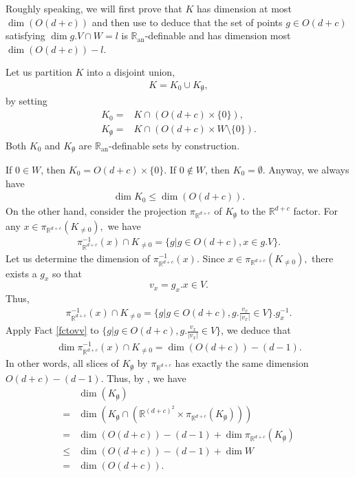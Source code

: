 \documentclass[11pt,a4paper]{amsart}
\numberwithin{equation}{section}
\newcommand{\es}{\emptyset}
\newcommand{\ran}{\mathbb{R}_{\operatorname{an}}}
\newcommand{\m}{^{-1}}
\newcommand{\R}{\mathbb{R}}
\theoremstyle{plain}
\theoremstyle{definition}
\numberwithin{equation}{subsection}
\begin{document}
Roughly speaking, we will first prove that $K$ has dimension at most $\dim(O(d+c))$ and then use \cite[Theorem 3.18]{MComin} to deduce that the set of points $g\in O(d+c)$ satisfying $\dim g.V\cap W=l$ is $\ran$-definable and has dimension most $\dim(O(d+c))-l$.

Let us partition $K$ into a disjoint union,
\begin{align*}
	K=K_0\cup K_{\not0},
\end{align*}
by setting
\begin{align*}
	K_0=&K\cap\left( O(d+c)\times\{0\}\right),\\ K_{\not0}=&K\cap \left(O(d+c)\times W\setminus\{0\}\right).
\end{align*}
Both $K_0$ and $K_{\not0}$ are $\ran$-definable sets by construction.

If $0\in W$, then $K_0= O(d+c)\times\{0\}$. If $0\not\in W$, then $K_0=\es.$ Anyway, we always have
\begin{align*}
	\dim K_0\le\dim(O(d+c)).
\end{align*}
On the other hand, consider the projection $\pi_{\R^{d+c}}$ of $K_{\not 0}$ to the $\R^{d+c}$ factor. For any $x\in \pi_{\R^{d+c}}(K_{\not=0}),$ we have
\begin{align*}
\pi_{\R^{d+c}}\m (x)\cap K_{\not=0}=\{g|g\in O(d+c),x\in g.V\}.
\end{align*}
Let us determine the dimension of $\pi_{\R^{d+c}}\m (x).$ Since $x\in \pi_{\R^{d+c}}(K_{\not=0}),$ there exists a $g_x$ so that $$v_x=g_x.x\in V.$$ Thus, 
\begin{align*}
\pi_{\R^{d+c}}\m (x)\cap K_{\not=0}=\{g|g\in O(d+c),g.\frac{v_x}{|v_x|}\in V\}.g_x\m.	
\end{align*}
Apply Fact \ref{fctovv} to $\{g|g\in O(d+c),g.\frac{v_x}{|v_x|}\in V\}$, we deduce that
\begin{align*}
	\dim \pi_{\R^{d+c}}\m (x)\cap K_{\not=0}=\dim(O(d+c))-(d-1).
\end{align*}
In other words, all slices of $K_{\not0}$ by $\pi_{\R^{d+c}}$ has exactly the same dimension $O(d+c)-(d-1)$. Thus, by \cite[Theorem 3.18, $X_d=\pi_{\R^{d+c}}(K_{\not 0}),d=\dim(O(d+c))-(d-1),m=d+c,n=(d+c)^2$]{MComin}, we have
\begin{align*}&\dim(K_{\not0})\\=&
\dim\left(K_{\not0}\cap \left(\R^{(d+c)^2}\times\pi_{\R^{d+c}}(K_{\not 0})\right)\right)\\=&\dim(O(d+c))-(d-1)+\dim \pi_{\R^{d+c}}(K_{\not 0})\\\le& \dim(O(d+c))-(d-1)+\dim W\\
=&\dim(O(d+c)).
\end{align*}
\end{document}
